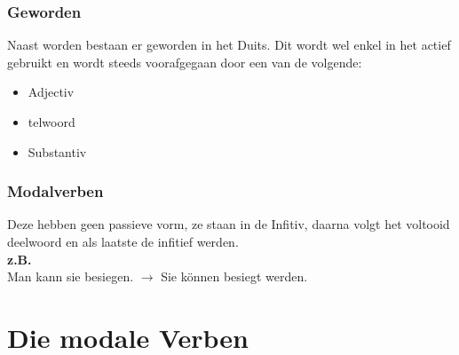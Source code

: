 \documentclass[main.tex]{subfiles}
\begin{document}
\subsubsection{Geworden}
Naast worden bestaan er geworden in het Duits. Dit wordt wel enkel in het actief gebruikt en wordt steeds voorafgegaan door een van de volgende:
\begin{itemize}
\item Adjectiv
\item telwoord
\item Substantiv
\end{itemize}
\subsubsection{Modalverben}
Deze hebben geen passieve vorm, ze staan in de Infitiv, daarna volgt het voltooid deelwoord en als laatste de infitief werden.\\
\textbf{z.B.}\\
Man kann sie besiegen. $\rightarrow$ Sie können besiegt werden.
\section{Die modale Verben}
\end{document}
